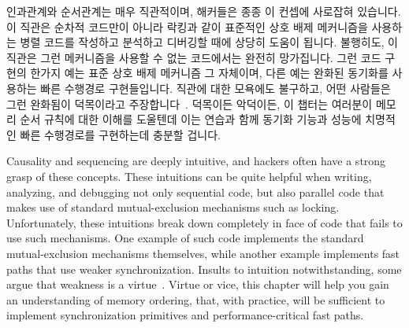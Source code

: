 
%

인과관계와 순서관계는 매우 직관적이며, 해커들은 종종 이 컨셉에 사로잡혀
있습니다.
이 직관은 순차적 코드만이 아니라 락킹과 같이 표준적인 상호 배제 메커니즘을
사용하는 병렬 코드를 작성하고 분석하고 디버깅할 때에 상당히 도움이 됩니다.
불행히도, 이 직관은 그런 메커니즘을 사용할 수 없는 코드에서는 완전히
망가집니다.
그런 코드 구현의 한가지 예는 표준 상호 배제 메커니즘 그 자체이며, 다른 예는
완화된 동기화를 사용하는 빠른 수행경로 구현들입니다.
직관에 대한 모욕에도 불구하고, 어떤 사람들은 그런 완화됨이 덕목이라고
주장합니다~\cite{JadeAlglave2013-WeaknessIsVirtue}.
덕목이든 악덕이든, 이 챕터는 여러분이 메모리 순서 규칙에 대한 이해를 도울텐데
이는 연습과 함께 동기화 기능과 성능에 치명적인 빠른 수행경로를 구현하는데
충분할 겁니다.

\iffalse

Causality and sequencing are deeply intuitive, and hackers often
have a strong grasp of these concepts.
These intuitions can be quite helpful when writing, analyzing, and
debugging not only sequential code, but also parallel code that makes
use of standard mutual-exclusion mechanisms such as locking.
Unfortunately, these intuitions break down completely in face of
code that fails to use such mechanisms.
One example of such code implements the standard mutual-exclusion
mechanisms themselves, while another example implements fast
paths that use weaker synchronization.
Insults to intuition notwithstanding, some argue that weakness is a
virtue~\cite{JadeAlglave2013-WeaknessIsVirtue}.
Virtue or vice, this chapter will help you gain an understanding of
memory ordering, that, with practice, will be sufficient to implement
synchronization primitives and performance-critical fast paths.

